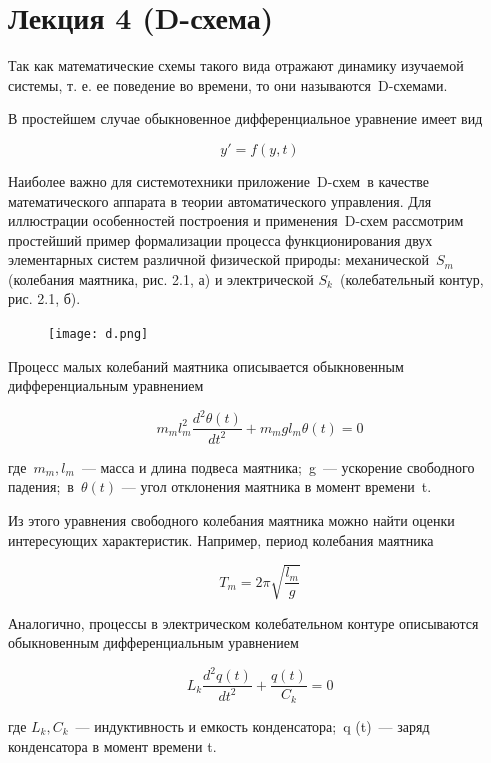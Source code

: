 \documentclass[14pt]{extarticle}
\begin{document}
\section*{Лекция 4 (D-схема)}

Так как математические схемы такого вида отражают динамику изучаемой системы, т. е. ее поведение во времени, то они называют­ся D-схемами. 

В простейшем случае обыкновенное дифференциальное уравне­ние имеет вид

\begin{equation}
y'= f(y,t)	
\end{equation}

Наиболее важно для системотехники приложение D-схем в каче­стве математического аппарата в теории автоматического управле­ния. Для иллюстрации особенностей построения и применения D-схем рассмотрим простейший пример формализации процесса функционирования двух элементарных систем различной физической природы: механической $S_m$ (колебания маятника, рис. 2.1, а) и электрической $S_k$ (колебательный контур, рис. 2.1, б).

\begin{figure}[h!]
    \centering
    \texttt{[image: d.png]}
\end{figure}

Процесс малых колебаний маятника описывается обыкновенным дифференциальным уравнением

\begin{equation}
	m_m l_m^2 \frac{d^2\theta(t)}{dt^2} + m_m g l_m \theta(t) = 0
\end{equation}

где $m_m, l_m$ — масса и длина подвеса маят­ника; g — ускорение свободного падения; в $\theta(t)$ — угол отклонения маятника в момент времени t.

Из этого уравнения свободного колебания маятника можно найти оценки интересующих характеристик. Например, период ко­лебания маятника

\begin{equation}
	T_m = 2 \pi \sqrt{\frac{l_m}{g}}
\end{equation}

Аналогично, процессы в электрическом колебательном контуре описываются обыкновенным дифференциальным уравнением

\begin{equation}
	L_k \frac{d^2q(t)}{dt^2}+\frac{q(t)}{C_k} = 0
\end{equation}

где $L_k,C_k$ — индуктивность и емкость конденсатора; q (t) — заряд конденсатора в момент времени t.
\end{document}

